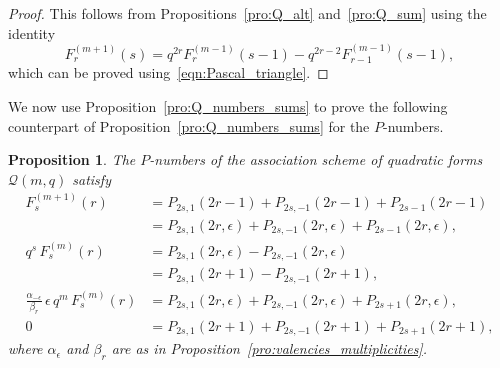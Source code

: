 \documentclass[10pt]{article}
\newtheorem{prop}[theorem]{Proposition}
\theoremstyle{definition}
\newcommand{\Q}{\mathscr{Q}}
\newcommand{\e}{\epsilon}
\begin{document}
\begin{proof}
This follows from Propositions~\ref{pro:Q_alt} and~\ref{pro:Q_sum} using the identity
\begin{equation}
F^{(m+1)}_{r}(s)=q^{2r}F^{(m-1)}_{r}(s-1)-q^{2r-2}F^{(m-1)}_{r-1}(s-1),   \label{eqn:F_identity}
\end{equation}
which can be proved using~\eqref{eqn:Pascal_triangle}.
\end{proof}
\par
We now use Proposition~\ref{pro:Q_numbers_sums} to prove the following counterpart of Proposition~\ref{pro:Q_numbers_sums} for the $P$-numbers.
\begin{prop}
\label{pro:P_numbers_sums}
The $P$-numbers of the association scheme of quadratic forms $\Q(m,q)$ satisfy
\begin{align}
F^{(m+1)}_s(r)&=P_{2s,1}(2r-1)+P_{2s,-1}(2r-1)+P_{2s-1}(2r-1)   \label{eqn:P_sum_1}\\
&=P_{2s,1}(2r,\e)+P_{2s,-1}(2r,\e)+P_{2s-1}(2r,\e),   \nonumber\\%
%
q^s\,F^{(m)}_s(r)&=P_{2s,1}(2r,\e)-P_{2s,-1}(2r,\e)   \label{eqn:P_sum_2}\\
&=P_{2s,1}(2r+1)-P_{2s,-1}(2r+1),   \nonumber\\[0.3ex]
%
\frac{\alpha_{-\e}}{\beta_r}\,\e\,q^m\,F^{(m)}_s(r)&=P_{2s,1}(2r,\e)+P_{2s,-1}(2r,\e)+P_{2s+1}(2r,\e),   \label{eqn:P_sum_3}\\[-1ex]
0&=P_{2s,1}(2r+1)+P_{2s,-1}(2r+1)+P_{2s+1}(2r+1),   \label{eqn:P_sum_4}
\end{align}
where $\alpha_\e$ and $\beta_r$ are as in Proposition~\ref{pro:valencies_multiplicities}.
\end{prop}
\end{document}
